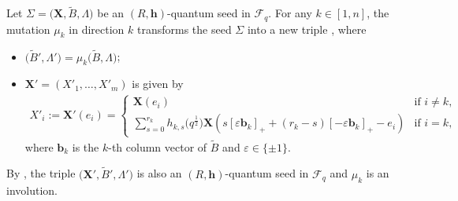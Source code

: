  \begin{Definition}\label{mutation_of_generalzied_seed}
Let $\Sigma=\bigl(\mathbf{X},\tilde{B},\Lambda\bigr)$ be an $(R,\mathbf{h})$-quantum seed in $\mathcal{F}_q$. For any $k\in[1,n]$, the mutation $\mu_k$ in direction $k$ transforms the seed $\Sigma$ into a new triple , where
\begin{itemize}\itemsep=0pt
\item[(1)] $\bigl(\tilde{B}', \Lambda'\bigr)=\mu_{k}\bigl(\tilde{B},\Lambda\bigr)$;
\item[(2)] $\mathbf{X}'=(X'_1,\dots, X'_m)$ is given by
\begin{align*}
 X'_i:=\mathbf{X}'(e_i)=\begin{cases}
 \mathbf{X}(e_i)&\text{if }i\neq k,\\
 \displaystyle\sum\limits_{s=0}^{r_k}h_{k,s}\bigl(q^{\frac{1}{2}}\bigr)\mathbf{X}(s[\varepsilon \mathbf{b}_k]_{+}+(r_{k}-s)[-\varepsilon \mathbf{b}_k]_+-e_i)&\text{if }i=k,
 \end{cases}
\end{align*}
where $\mathbf{b}_k$ is the $k$-th column vector of $\tilde{B}$ and $\varepsilon\in\{\pm 1\}$.
\end{itemize}
\end{Definition}
By \cite[Propositions 3.6 and 3.7]{BCDX2018}, the triple $\bigl(\mathbf{X}',\tilde{B}',\Lambda'\bigr)$ is also an $(R,\mathbf{h})$-quantum seed in $\mathcal{F}_q$ and $\mu_{k}$ is an involution.

